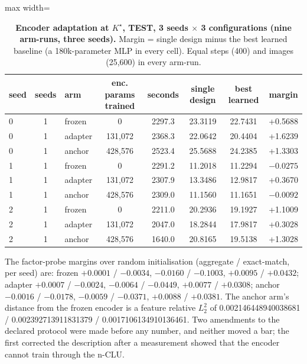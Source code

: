 \documentclass{article} %
\newcommand{\Kstar}{\ensuremath{K^{\star}}}
\begin{document}
\begin{table}[h]
\centering\small
\caption{\textbf{Encoder adaptation at $\Kstar$, TEST, 3 seeds $\times$ 3 configurations (nine
arm-runs, three seeds).} Margin = single design minus the best learned baseline (a 180k-parameter %
MLP in every cell). Equal steps (400) and images (25,600) in every arm-run.} %
\label{tab:adapt}
\setlength{\tabcolsep}{3pt}
\begin{adjustbox}{max width=\linewidth}\begin{tabular}{lclccccc}
\toprule
seed & seeds & arm & enc. params trained & seconds & single design & best learned & margin \\
\midrule
0 & 1 & frozen & 0 & 2297.3 & 23.3119 & 22.7431 & +0.5688 \\
0 & 1 & adapter & 131,072 & 2368.3 & 22.0642 & 20.4404 & +1.6239 \\
0 & 1 & anchor & 428,576 & 2523.4 & 25.5688 & 24.2385 & +1.3303 \\
1 & 1 & frozen & 0 & 2291.2 & 11.2018 & 11.2294 & $-0.0275$ \\
1 & 1 & adapter & 131,072 & 2307.9 & 13.3486 & 12.9817 & +0.3670 \\
1 & 1 & anchor & 428,576 & 2309.0 & 11.1560 & 11.1651 & $-0.0092$ \\
2 & 1 & frozen & 0 & 2211.0 & 20.2936 & 19.1927 & +1.1009 \\
2 & 1 & adapter & 131,072 & 2047.0 & 18.2844 & 17.9817 & +0.3028 \\
2 & 1 & anchor & 428,576 & 1640.0 & 20.8165 & 19.5138 & +1.3028 \\
\bottomrule
\end{tabular}\end{adjustbox}
\end{table}

\noindent The factor-probe margins over random initialisation (aggregate / exact-match, per seed) are: frozen $+0.0001$ / $-0.0034$, $-0.0160$ / $-0.1003$, $+0.0095$ / $+0.0432$; adapter
$+0.0007$ / $-0.0024$, $-0.0064$ / $-0.0449$, $+0.0077$ / $+0.0308$; anchor $-0.0016$ / $-0.0178$,
$-0.0059$ / $-0.0371$, $+0.0088$ / $+0.0381$. The anchor arm's distance from the frozen encoder
is a feature relative $L_2^2$ of 0.002146448940038681 / 0.002392713911831379 /
0.0017106134910136461. %
Two amendments to the declared protocol were made before any number, and neither moved a bar; the first
corrected the description after a measurement showed that the encoder cannot train through the
n-CLU. %
\end{document}
